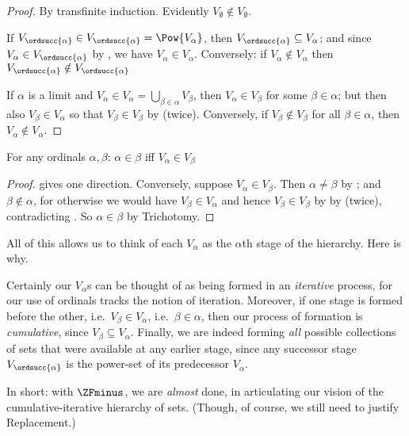 \documentclass[../../../include/open-logic-section]{subfiles}
\begin{document}
\begin{proof}
	By transfinite induction. Evidently $V_\emptyset \notin V_\emptyset$. 
	
	If $V_{\ordsucc{\alpha}} \in V_{\ordsucc{\alpha}} = \Pow{V_\alpha}$, then $V_{\ordsucc{\alpha}} \subseteq V_\alpha$; and since $V_\alpha \in V_{\ordsucc{\alpha}}$ by , we have $V_\alpha \in V_\alpha$. Conversely: if $V_\alpha \notin V_\alpha$ then $V_{\ordsucc{\alpha}} \notin V_{\ordsucc{\alpha}}$
	
	If $\alpha$ is a limit and $V_\alpha \in V_\alpha = \bigcup_{\beta \in \alpha}V_\beta$, then $V_\alpha \in V_\beta$ for some $\beta \in \alpha$; but then also $V_\beta \in V_\alpha$ so that $V_\beta \in V_\beta$ by  (twice). Conversely, if $V_\beta \notin V_\beta$ for all $\beta \in \alpha$, then $V_\alpha \notin V_\alpha$.	
\end{proof}
\begin{cor}
	For any ordinals $\alpha, \beta$: $\alpha \in \beta$ iff $V_\alpha \in V_\beta$
\end{cor}
\begin{proof}
	 gives one direction. Conversely, suppose $V_\alpha \in V_\beta$. Then $\alpha \neq \beta$ by ; and $\beta \notin \alpha$, for otherwise we would have $V_\beta \in V_\alpha$ and hence $V_\beta \in V_\beta$ by by  (twice), contradicting . So $\alpha \in \beta$ by Trichotomy.
\end{proof}
\noindent
All of this allows us to think of each $V_\alpha$ as the $\alpha$th stage of the hierarchy. Here is why.

Certainly our $V_\alpha$s can be thought of as being formed in an \emph{iterative} process, for our use of ordinals tracks the notion of iteration. Moreover, if one stage is formed before the other, i.e.\ $V_\beta \in V_\alpha$, i.e.\ $\beta \in \alpha$, then our process of formation is \emph{cumulative}, since $V_\beta \subseteq V_\alpha$. Finally, we are indeed forming \emph{all} possible collections of sets that were available at any earlier stage, since any successor stage $V_{\ordsucc{\alpha}}$ is the power-set of its predecessor $V_\alpha$. 

In short: with $\ZFminus$, we are \emph{almost} done, in articulating our vision of the cumulative-iterative hierarchy of sets. (Though, of course, we still need to justify Replacement.)
\end{document}
